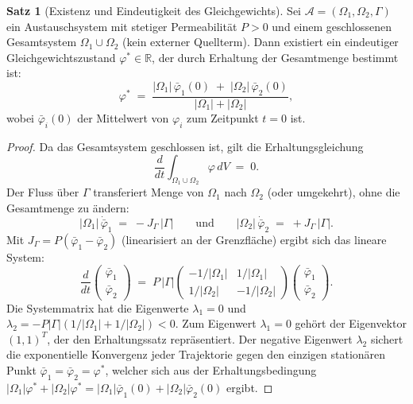 ﻿\documentclass[a4paper,12pt]{article}
\theoremstyle{definition}
\newtheorem{satz}{Satz}
\begin{document}
\begin{satz}[Existenz und Eindeutigkeit des Gleichgewichts]
    Sei $\mathcal{A} = (\Omega_1, \Omega_2, \Gamma)$ ein Austauschsystem mit
    stetiger Permeabilität $P > 0$ und einem geschlossenen Gesamtsystem
    $\Omega_1 \cup \Omega_2$ (kein externer Quellterm). Dann existiert ein
    eindeutiger Gleichgewichtszustand $\varphi^* \in \mathbb{R}$, der durch
    Erhaltung der Gesamtmenge bestimmt ist:
    \[
        \varphi^* \;=\; \frac{|\Omega_1|\,\bar\varphi_1(0) \;+\; |\Omega_2|\,\bar\varphi_2(0)}{|\Omega_1| + |\Omega_2|},
    \]
    wobei $\bar\varphi_i(0)$ der Mittelwert von $\varphi_i$ zum Zeitpunkt $t=0$ ist.
\end{satz}

\begin{proof}
    Da das Gesamtsystem geschlossen ist, gilt die Erhaltungsgleichung
    \[
        \frac{d}{dt}\int_{\Omega_1 \cup \Omega_2} \varphi \,dV \;=\; 0.
    \]
    Der Fluss über $\Gamma$ transferiert Menge von $\Omega_1$ nach $\Omega_2$
    (oder umgekehrt), ohne die Gesamtmenge zu ändern:
    \[
        |\Omega_1|\,\dot{\bar\varphi}_1 \;=\; -J_\Gamma\,|\Gamma|
        \qquad \text{und} \qquad
        |\Omega_2|\,\dot{\bar\varphi}_2 \;=\; +J_\Gamma\,|\Gamma|.
    \]
    Mit $J_\Gamma = P(\bar\varphi_1 - \bar\varphi_2)$ (linearisiert an der Grenzfläche) ergibt sich
    das lineare System:
    \[
        \frac{d}{dt}\begin{pmatrix} \bar\varphi_1 \\ \bar\varphi_2 \end{pmatrix}
        \;=\; P\,|\Gamma|
        \begin{pmatrix} -1/|\Omega_1| & 1/|\Omega_1| \\ 1/|\Omega_2| & -1/|\Omega_2| \end{pmatrix}
        \begin{pmatrix} \bar\varphi_1 \\ \bar\varphi_2 \end{pmatrix}.
    \]
    Die Systemmatrix hat die Eigenwerte $\lambda_1 = 0$ und
    $\lambda_2 = -P|\Gamma|(1/|\Omega_1| + 1/|\Omega_2|) < 0$.
    Zum Eigenwert $\lambda_1 = 0$ gehört der Eigenvektor $(1,1)^T$, der den
    Erhaltungssatz repräsentiert. Der negative Eigenwert $\lambda_2$ sichert
    die exponentielle Konvergenz jeder Trajektorie gegen den einzigen
    stationären Punkt $\bar\varphi_1 = \bar\varphi_2 = \varphi^*$,
    welcher sich aus der Erhaltungsbedingung
    $|\Omega_1|\varphi^* + |\Omega_2|\varphi^* = |\Omega_1|\bar\varphi_1(0) + |\Omega_2|\bar\varphi_2(0)$
    ergibt. \qedhere
\end{proof}
\end{document}
